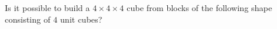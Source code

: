 Is it possible to build a $ 4\times 4\times4$ cube from blocks of the following shape consisting of $ 4$ unit cubes?